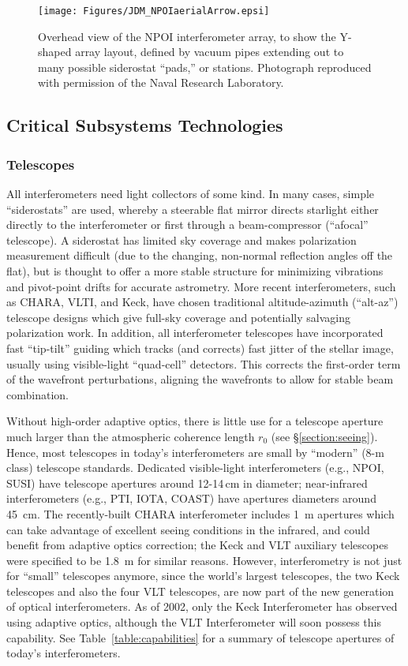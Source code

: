 \documentclass[12pt]{iopart}
\begin{document}
\begin{figure}
\begin{center}
\texttt{[image: Figures/JDM\_NPOIaerialArrow.epsi]}
\caption
{Overhead view of the NPOI interferometer array, to show the
Y-shaped array layout, defined by vacuum pipes extending out to many
possible siderostat ``pads,'' or stations. Photograph reproduced with
permission of the Naval Research Laboratory.
\label{npoi}}
\end{center}
\end{figure}

\subsection{Critical Subsystems Technologies}

\subsubsection{Telescopes}
All interferometers need light collectors of some kind.  In many
cases, simple ``siderostats'' are used, whereby a steerable flat
mirror directs starlight either directly to the interferometer or
first through a beam-compressor (``afocal'' telescope).  A siderostat
has limited sky coverage and makes polarization measurement difficult
(due to the changing, non-normal reflection angles off the flat), but
is thought to offer a more stable structure for minimizing vibrations
and pivot-point drifts for accurate astrometry.  More recent
interferometers, such as CHARA, VLTI, and Keck, have chosen
traditional altitude-azimuth (``alt-az'') telescope designs which give
full-sky coverage and potentially salvaging polarization work.  In
addition, all interferometer telescopes have incorporated fast
``tip-tilt'' guiding which tracks (and corrects) fast jitter of
the stellar image, usually using visible-light ``quad-cell''
detectors.  This corrects the first-order term of the wavefront
perturbations, aligning the wavefronts to allow for stable beam
combination.

Without high-order adaptive optics, there is little use for a
telescope aperture much larger than the atmospheric coherence length
$r_0$ (see \S\ref{section:seeing}). Hence, most telescopes in today's
interferometers are small by ``modern'' (8-m class) telescope
standards.  Dedicated visible-light interferometers (e.g., NPOI, SUSI)
have telescope apertures around 12-14\,cm in diameter; near-infrared
interferometers (e.g., PTI, IOTA, COAST) have apertures diameters
around 45~cm.  The recently-built CHARA interferometer includes 1~m
apertures which can take advantage of excellent seeing conditions in
the infrared, and could benefit from adaptive optics correction; the
Keck and VLT auxiliary telescopes were specified to be 1.8~m for
similar reasons.  However, interferometry is not just for ``small''
telescopes anymore, since the world's largest telescopes, the two Keck
telescopes and also the four VLT telescopes, are now part of the new
generation of optical interferometers.  As of 2002, only the Keck
Interferometer has observed using adaptive optics, although the VLT
Interferometer will soon possess this capability.  See
Table~\ref{table:capabilities} for a summary of telescope apertures of
today's interferometers.
\end{document}
